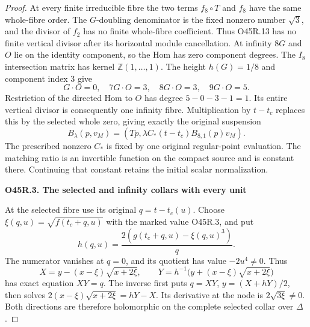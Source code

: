 \begin{proof}
At every finite irreducible fibre the two
terms \(f_8\circ T\) and \(f_8\) have the same
whole-fibre order. The \(G\)-doubling denominator
is the fixed nonzero number \(\sqrt3\), and
the divisor of \(f_2\) has no finite
whole-fibre coefficient. Thus O45R.13 has
no finite vertical divisor after its
horizontal module cancellation. At infinity
\(8G\) and \(O\) lie on the identity
component, so the Hom has zero component
degrees. The \(I_8\) intersection matrix
has kernel \(\mathbb Z(1,\ldots,1)\).
The height \(h(G)=1/8\) and component
index \(3\) give
\[
 G\cdot O=0,\quad 7G\cdot O=3,\quad
 8G\cdot O=3,\quad 9G\cdot O=5 .
 \tag{O45R.18}
\]
Restriction of the directed Hom to \(O\)
has degree \(5-0-3-1=1\). Its entire
vertical divisor is consequently one
infinity fibre. Multiplication by \(t-t_c\)
replaces this by the selected whole zero,
giving exactly the original suspension
\[
 B_\lambda(p,v_M)=
  (Tp,\lambda C_*(t-t_c)B_{8,1}(p)v_M).
 \tag{O45R.19}
\]
The prescribed nonzero \(C_*\) is fixed by
one original regular-point evaluation.
The matching ratio is an invertible
function on the compact source and is
constant there. Continuing that constant
retains the initial scalar normalization.

\par

\medskip\noindent\textbf{O45R.3. The selected and infinity collars with every unit}

\par\nobreak

At the selected fibre use its original
\(q=t-t_c(u)\). Choose
\(\xi(q,u)=\sqrt{f(t_c+q,u)}\) with the
marked value O45R.3, and put
\[
 h(q,u)=\frac{2(g(t_c+q,u)-\xi(q,u)^3)}q.
 \tag{O45R.20}
\]
The numerator vanishes at \(q=0\), and its
quotient has value \(-2u^4\ne0\). Thus
\[
 X=y-(x-\xi)\sqrt{x+2\xi},\qquad
 Y=h^{-1}\bigl(y+(x-\xi)\sqrt{x+2\xi}\bigr)
 \tag{O45R.21}
\]
has exact equation \(XY=q\). The inverse
first puts \(q=XY\), \(y=(X+hY)/2\),
then solves
\(2(x-\xi)\sqrt{x+2\xi}=hY-X\).
Its derivative at the node is
\(2\sqrt{3\xi}\ne0\). Both directions are
therefore holomorphic on the complete
selected collar over \(\Delta\).


\end{proof}

